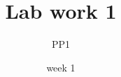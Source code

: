 \documentclass[12pt]{article}%
\begin{document}
    \title{Lab work 1}
    \date{week 1}
    \author{PP1}



    \maketitle
    \thispagestyle{empty}
    
    
    
    
    
\end{document}

